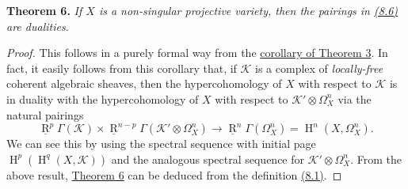 \documentclass{article}
\newenvironment{itenv}[1]
  {\phantomsection\par\smallskip\noindent\textbf{#1.}\itshape}
  {\par\smallskip}
\theoremstyle{definition}
\theoremstyle{definition}
\theoremstyle{definition}
\theoremstyle{definition}
\theoremstyle{remark}
\begin{document}
\leavevmode{}%
\begin{itenv}{Theorem 6}
If \(X\) is a non-singular projective variety, then the pairings in \protect\hyperlink{fga-1-equation-8.6}{(8.6)} are dualities.

\end{itenv}

\begin{proof}
This follows in a purely formal way from the \protect\hyperlink{fga-1-theorem-3-corollary}{corollary of Theorem 3}.
In fact, it easily follows from this corollary that, if \({\mathscr{K}}\) is a complex of \emph{locally-free} coherent algebraic sheaves, then the hypercohomology of \(X\) with respect to \({\mathscr{K}}\) is in duality with the hypercohomology of \(X\) with respect to \({\mathscr{K}}'\otimes\Omega_X^n\) via the natural pairings
\[
  \underline{\operatorname{R}}^p\Gamma({\mathscr{K}})
  \times \underline{\operatorname{R}}^{n-p}\Gamma({\mathscr{K}}'\otimes\Omega_X^n)
  \to \underline{\operatorname{R}}^n\Gamma(\Omega_X^n)
  = \operatorname{H}^n(X,\Omega_X^n).
\tag{8.7}
\]
We can see this by using the spectral sequence with initial page \(\operatorname{H}^p(\operatorname{H}^q(X,{\mathscr{K}}))\) and the analogous spectral sequence for \({\mathscr{K}}'\otimes\Omega_X^n\).
From the above result, \protect\hyperlink{fga-1-theorem-6}{Theorem 6} can be deduced from the definition \protect\hyperlink{fga-1-equation-8.1}{(8.1)}.
\end{proof}
\end{document}
